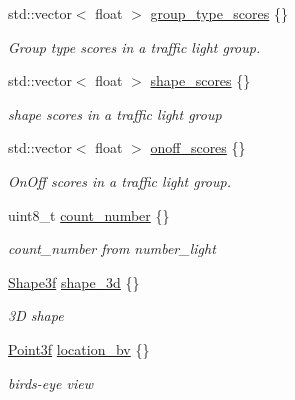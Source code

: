 \begin{DoxyCompactItemize}
std\+::vector$<$ float $>$ \hyperlink{structmaf__perception__interface_1_1PhysicalTrafficLightSingleFrame_a46173e1ebd7aa97cd041ee2e42927a61}{group\+\_\+type\+\_\+scores} \{\}
\begin{DoxyCompactList}\small\item\em Group type scores in a traffic light group. \end{DoxyCompactList}\item 
std\+::vector$<$ float $>$ \hyperlink{structmaf__perception__interface_1_1PhysicalTrafficLightSingleFrame_acff0f8083b1e111612d97782bb17fc30}{shape\+\_\+scores} \{\}
\begin{DoxyCompactList}\small\item\em shape scores in a traffic light group \end{DoxyCompactList}\item 
std\+::vector$<$ float $>$ \hyperlink{structmaf__perception__interface_1_1PhysicalTrafficLightSingleFrame_a07564a33b706d6d6ff28884866be27d1}{onoff\+\_\+scores} \{\}
\begin{DoxyCompactList}\small\item\em On\+Off scores in a traffic light group. \end{DoxyCompactList}\item 
uint8\+\_\+t \hyperlink{structmaf__perception__interface_1_1PhysicalTrafficLightSingleFrame_a726c9c5e8f31a6d4b431d4cf41ee6092}{count\+\_\+number} \{\}
\begin{DoxyCompactList}\small\item\em count\+\_\+number from number\+\_\+light \end{DoxyCompactList}\item 
\hyperlink{structmaf__perception__interface_1_1Shape3f}{Shape3f} \hyperlink{structmaf__perception__interface_1_1PhysicalTrafficLightSingleFrame_a7d099809b7f0035e1b58c56bf6031ddf}{shape\+\_\+3d} \{\}
\begin{DoxyCompactList}\small\item\em 3D shape \end{DoxyCompactList}\item 
\hyperlink{structmaf__perception__interface_1_1Point3f}{Point3f} \hyperlink{structmaf__perception__interface_1_1PhysicalTrafficLightSingleFrame_a3e3a2e6efb494a1dc1d3d918d5a6a735}{location\+\_\+bv} \{\}
\begin{DoxyCompactList}\small\item\em bird\textquotesingle{}s-\/eye view \end{DoxyCompactList}\item 

\end{DoxyCompactItemize}
